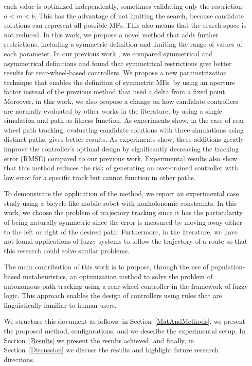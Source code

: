 \documentclass[symmetry,article,submit,moreauthors,pdftex]{Definitions/mdpi}
\begin{document}
each value is optimized independently, sometimes validating only the
restriction $a < m <b$. This has the advantage of not limiting the 
search, because candidate solutions can represent all possible MFs. This 
also means that the search space is not reduced.   
In this work, we propose a novel method that adds further restrictions,
including a symmetric definition and limiting the range of values of each
parameter. In our previous work \cite{mancilla2022tracking,Mancilla2021}, we
compared symmetrical and asymmetrical definitions and found that symmetrical
restrictions give better results for rear-wheel-based controllers. We propose a
new parametrization technique that enables the definition of symmetric MFs, by
using an aperture factor instead of the previous method that used a delta from
a fixed point.  Moreover, in this work, we also propose a change on how
candidate controllers are normally evaluated by other works in the literature,
by using a single simulation and path as fitness function. As experiments show,
in the case of rear-wheel path tracking, evaluating candidate solutions with
three simulations using distinct paths, gives better results.  As experiments
show, these additions greatly improve the controller's optimal design by
significantly decreasing the tracking error (RMSE) compared to our previous
work. Experimental results also show that this method reduces the risk of
generating an over-trained controller with low error for a specific track but
cannot function in other paths. 

To demonstrate the application of the method, we report an experimental case
study using a bicycle-like mobile robot with nonholonomic constraints.  In this
work, we choose the problem of trajectory tracking since it has the
particularity of being naturally symmetric since the error is measured by
moving away either to the left or right of the desired path. Furthermore, in
the literature, we have not found applications of fuzzy systems to follow the
trajectory of a route so that this research could solve similar problems.

The main contribution of this work is to propose, through the use of 
population-based metaheuristics, an optimization method to solve the problem of
autonomous path tracking using a rear-wheel controller in the framework of
fuzzy logic. This approach enables the design of controllers using rules that
are linguistically familiar to human users.

We structure this document as follows: in Section~\ref{MatAndMethods}, we
present the proposed method, configurations, and we describe the experimental
setup. In Section~\ref{Results} we present the results achieved, and finally,
in Section~\ref{Discussion} we discuss the results and highlight future
research directions.
\end{document}
